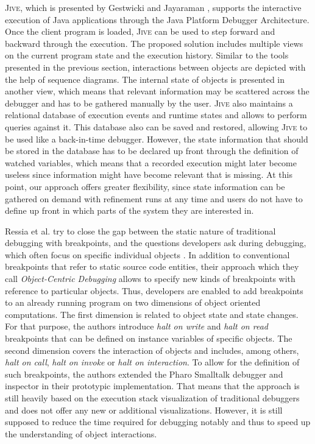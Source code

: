 \textsc{Jive}, which is presented by Gestwicki and Jayaraman \cite{gestwicki_jive:_2004, gestwicki_methodology_2005}, supports the interactive execution of Java applications through the Java Platform Debugger Architecture.
Once the client program is loaded, \textsc{Jive} can be used to step forward and backward through the execution.
The proposed solution includes multiple views on the current program state and the execution history.
Similar to the tools presented in the previous section, interactions between objects are depicted with the help of sequence diagrams.
The internal state of objects is presented in another view, which means that relevant information may be scattered across the debugger and has to be gathered manually by the user.
\textsc{Jive} also maintains a relational database of execution events and runtime states and allows to perform queries against it.
This database also can be saved and restored, allowing \textsc{Jive} to be used like a back-in-time debugger.
However, the state information that should be stored in the database has to be declared up front through the definition of watched variables, which means that a recorded execution might later become useless since information might have become relevant that is missing.
At this point, our approach offers greater flexibility, since state information can be gathered on demand with refinement runs at any time and users do not have to define up front in which parts of the system they are interested in.

Ressia et al. try to close the gap between the static nature of traditional  debugging with breakpoints, and the questions developers ask during debugging,  which often focus on specific individual objects \cite{ressia_object-centric_2012}.
In addition to conventional breakpoints that refer to static source code entities, their approach which they call \emph{Object-Centric Debugging} allows to specify new kinds of breakpoints with reference to particular objects.
Thus, developers are enabled to add breakpoints to an already running program on two dimensions of object oriented computations.
The first dimension is related to object state and state changes.
For that purpose, the authors introduce \emph{halt on write} and \emph{halt on read} breakpoints that can be defined on instance variables of specific objects.
The second dimension covers the interaction of objects and includes, among others, \emph{halt on call}, \emph{halt on invoke} or \emph{halt on interaction}.
To allow for the definition of such breakpoints, the authors extended the Pharo Smalltalk debugger and inspector in their prototypic implementation.
That means that the approach is still heavily based on the execution stack visualization of traditional debuggers and does not offer any new or additional visualizations.
However, it is still supposed to reduce the time required for debugging notably and thus to speed up the understanding of object interactions.

